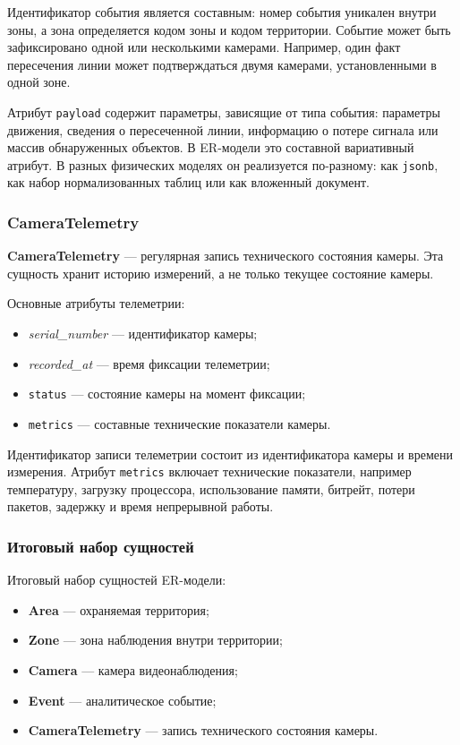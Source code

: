 Идентификатор события является составным: номер события уникален внутри зоны,
а зона определяется кодом зоны и кодом территории. Событие может быть
зафиксировано одной или несколькими камерами. Например, один факт пересечения
линии может подтверждаться двумя камерами, установленными в одной зоне.

Атрибут \texttt{payload} содержит параметры, зависящие от типа события:
параметры движения, сведения о пересеченной линии, информацию о потере
сигнала или массив обнаруженных объектов. В ER-модели это составной
вариативный атрибут. В разных физических моделях он реализуется по-разному:
как \texttt{jsonb}, как набор нормализованных таблиц или как вложенный
документ.

\subsubsection{CameraTelemetry}

\textbf{CameraTelemetry} --- регулярная запись технического состояния камеры.
Эта сущность хранит историю измерений, а не только текущее состояние камеры.

Основные атрибуты телеметрии:

\begin{itemize}
  \item \emph{serial\_number} --- идентификатор камеры;
  \item \emph{recorded\_at} --- время фиксации телеметрии;
  \item \texttt{status} --- состояние камеры на момент фиксации;
  \item \texttt{metrics} --- составные технические показатели камеры.
\end{itemize}

Идентификатор записи телеметрии состоит из идентификатора камеры и времени
измерения. Атрибут \texttt{metrics} включает технические показатели, например
температуру, загрузку процессора, использование памяти, битрейт, потери
пакетов, задержку и время непрерывной работы.

\subsubsection{Итоговый набор сущностей}

Итоговый набор сущностей ER-модели:

\begin{itemize}
  \item \textbf{Area} --- охраняемая территория;
  \item \textbf{Zone} --- зона наблюдения внутри территории;
  \item \textbf{Camera} --- камера видеонаблюдения;
  \item \textbf{Event} --- аналитическое событие;
  \item \textbf{CameraTelemetry} --- запись технического состояния камеры.
\end{itemize}
